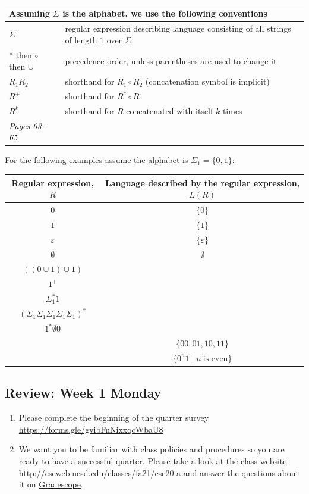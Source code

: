 \documentclass[12pt, oneside]{article}
\begin{document}
    
    \begin{center}
    \begin{tabular}{|ll|}
    \hline
    \multicolumn{2}{|l|}{Assuming $\Sigma$ is the alphabet, we use the following conventions}\\
    \hline
    $\Sigma$   & regular  expression describing language consisting of  all strings  of length  $1$ over $\Sigma$\\
    $*$ then $\circ$ then $\cup$   & precedence order, unless parentheses are used to change it\\
    $R_1R_2$ & shorthand  for  $R_1  \circ R_2$ (concatenation symbol is implicit) \\
    $R^+$ & shorthand for $R^* \circ R$ \\
    $R^k$ & shorthand for $R$ concatenated with itself $k$ times\\
    \hline
    {\it Pages 63 - 65 }& \\
    \hline
    \end{tabular}
    \end{center}
    
    
    For the following examples assume the alphabet is $\Sigma_1 =  \{0,1\}$:
    
    \begin{center}
    \renewcommand{\arraystretch}{1.5}
    \begin{tabular}{c|c}
    Regular expression, $R$ & Language described by the regular expression, $L(R)$\\
    \hline
    $0$ &$ \{ 0 \}$ \\
    $1$ & $\{ 1 \}$ \\
    $\varepsilon$ & $\{ \varepsilon  \}$ \\
    $\emptyset$ & $\emptyset$ \\
    $((0 \cup 1) \cup 1)$ & \\
    $1^+$ & \\
    $\Sigma_1^* 1$ & \\
    $(\Sigma_1 \Sigma_1 \Sigma_1 \Sigma_1 \Sigma_1)^*$ & \\
    $1^* \emptyset 0$ & \\
    & $\{00, 01, 10, 11\}$  \\
    & $\{ 0^n1 \mid n~\text{is even} \}$
    \end{tabular}
    \end{center}     
\newpage
\subsection*{Review: Week 1 Monday}
\begin{enumerate}
\item Please complete the beginning of the quarter survey \href{https://forms.gle/gvibFnNixxqcWbaU8}{https://forms.gle/gvibFnNixxqcWbaU8}
\item We want you to be familiar with class policies and procedures so you are ready to have a successful quarter. 
Please take a look at the class website http://cseweb.ucsd.edu/classes/fa21/cse20-a
and answer the questions about it on \href{http://gradescope.com}{Gradescope}.
\end{enumerate}
\end{document}
